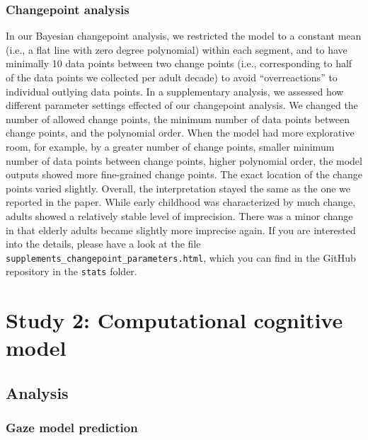 \documentclass[
  man,mask,floatsintext]{apa7}
\begin{document}
\hypertarget{changepoint-analysis}{%
\subsubsection{Changepoint analysis}\label{changepoint-analysis}}

In our Bayesian changepoint analysis, we restricted the model to a constant mean (i.e., a flat line with zero degree polynomial) within each segment, and to have minimally 10 data points between two change points (i.e., corresponding to half of the data points we collected per adult decade) to avoid ``overreactions'' to individual outlying data points. In a supplementary analysis, we assessed how different parameter settings effected of our changepoint analysis. We changed the number of allowed change points, the minimum number of data points between change points, and the polynomial order. When the model had more explorative room, for example, by a greater number of change points, smaller minimum number of data points between change points, higher polynomial order, the model outputs showed more fine-grained change points. The exact location of the change points varied slightly. Overall, the interpretation stayed the same as the one we reported in the paper. While early childhood was characterized by much change, adults showed a relatively stable level of imprecision. There was a minor change in that elderly adults became slightly more imprecise again. If you are interested into the details, please have a look at the file \texttt{supplements\_changepoint\_parameters.html}, which you can find in the GitHub repository in the \texttt{stats} folder.

\hypertarget{study-2-computational-cognitive-model}{%
\section{Study 2: Computational cognitive model}\label{study-2-computational-cognitive-model}}

\hypertarget{analysis-1}{%
\subsection{Analysis}\label{analysis-1}}

\hypertarget{gaze-model-prediction}{%
\subsubsection{Gaze model prediction}\label{gaze-model-prediction}}
\end{document}
